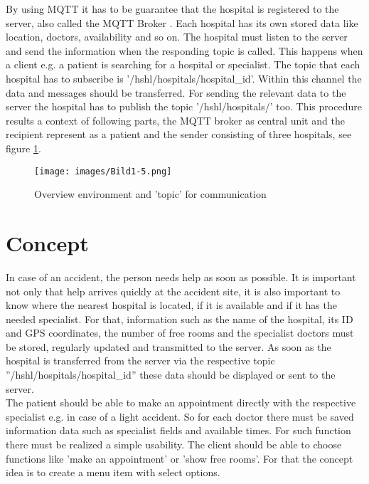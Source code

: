 
By using MQTT it has to be guarantee that the hospital is registered to the server, also called the MQTT Broker \cite{zabasta2018mqtt}. Each hospital has its own stored data like location, doctors, availability and so on. The hospital must listen to the server and send the information when the responding topic is called. This happens when a client e.g. a patient is searching for a hospital or specialist. The topic that each hospital has to subscribe is '/hshl/hospitals/hospital_id'. Within this channel the data and messages should be transferred. For sending the relevant data to the server the hospital has to publish the topic '/hshl/hospitals/' too. This procedure results a context of following parts, the MQTT broker as central unit and the recipient represent as a patient and the sender consisting of three hospitals, see figure \ref{Overview environment}. 

\begin{figure}[H]
\centering
\sidecaption
\texttt{[image: images/Bild1-5.png]}
\caption{Overview environment and 'topic' for communication}
\label{Overview environment}
\end{figure}



\section{Concept}
\label{sec:3}
In case of an accident, the person needs help as soon as possible. 
It is important not only that help arrives quickly at the accident site, 
it is also important to know where the nearest hospital is located, 
if it is available and if it has the needed specialist. For that, information such as the name of the hospital, its ID and  GPS coordinates, the number of free rooms and the specialist doctors must be stored, regularly updated and transmitted to the server.
As soon as the hospital is transferred from the server via the respective topic ''/hshl/hospitals/hospital_id'' 
these data should be displayed or sent to the server. 
\\
The patient should be able to make an appointment directly with the respective specialist e.g. in case of a light accident.
So for each doctor there must be saved information data such as specialist fields and available times.
For such function there must be realized a simple usability. The client should be able to choose functions like 'make an appointment' or 'show free rooms'. For that the concept idea is to create a menu item with select options.

